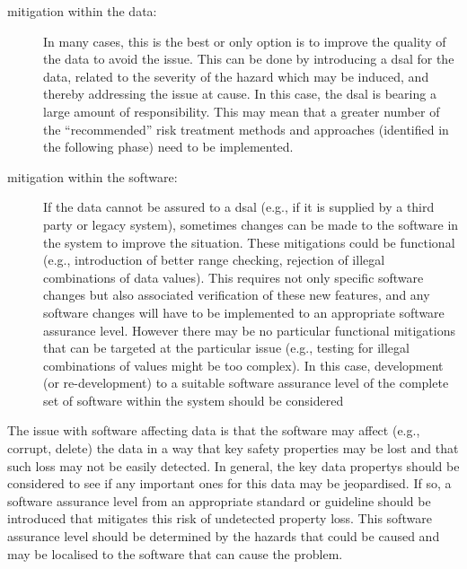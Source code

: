 \begin{description}
  \item[\Gls{mitigation} within the data:] In many cases, this is the best or only option is to improve the quality of the data to avoid the issue. This can be done by introducing a \gls{dsal} for the data, related to the severity of the \gls{hazard} which may be induced, and thereby addressing the issue at cause. In this case, the \gls{dsal} is bearing a large amount of responsibility. This may mean that a greater number of the ``recommended'' risk \gls{treatment} methods and approaches (identified in the following phase) need to be implemented.
  \item[\Gls{mitigation} within the software:] If the data cannot be assured to a \gls{dsal} (e.g., if it is supplied by a third party or legacy system), sometimes changes can be made to the software in the system to improve the situation. These \glspl{mitigation} could be functional (e.g., introduction of better range checking, rejection of illegal combinations of data values). This requires not only specific software changes but also associated \gls{verification} of these new features, and any software changes will have to be implemented to an appropriate \gls{software assurance level}. However there may be no particular functional \glspl{mitigation} that can be targeted at the particular issue (e.g., testing for illegal combinations of values might be too complex). In this case, development (or re-development) to a suitable \gls{software assurance level} of the complete set of software within the system should be considered
\end{description}

The issue with software affecting data is that the software may affect (e.g., corrupt, delete) the data in a way that key safety properties may be lost and that such loss may not be easily detected. In general, the key \glspl{data property} should be considered to see if any important ones for this data may be jeopardised. If so, a \gls{software assurance level} from an appropriate standard or guideline should be introduced that mitigates this risk of undetected property loss. This \gls{software assurance level} should be determined by the hazards that could be caused and may be localised to the software that can cause the problem.

